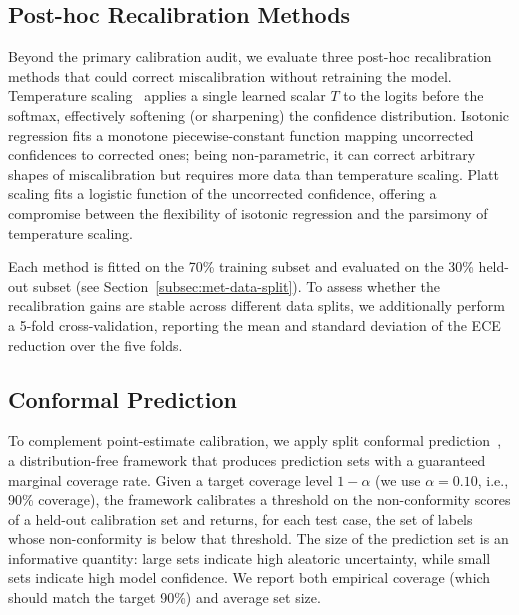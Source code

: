 \subsection{Post-hoc Recalibration Methods}
\label{subsec:met-recalibration}

Beyond the primary calibration audit, we evaluate three post-hoc 
recalibration methods that could correct miscalibration without retraining 
the model. Temperature scaling~\cite{guo2017calibration} applies a single 
learned scalar $T$ to the logits before the softmax, effectively 
softening (or sharpening) the confidence distribution. Isotonic 
regression fits a monotone piecewise-constant function mapping 
uncorrected confidences to corrected ones; being non-parametric, it can 
correct arbitrary shapes of miscalibration but requires more data than 
temperature scaling. Platt scaling fits a logistic function of the 
uncorrected confidence, offering a compromise between the flexibility of 
isotonic regression and the parsimony of temperature scaling.

Each method is fitted on the 70\% training subset and evaluated on the 
30\% held-out subset (see Section~\ref{subsec:met-data-split}). To assess 
whether the recalibration gains are stable across different data splits, 
we additionally perform a 5-fold cross-validation, reporting the mean 
and standard deviation of the ECE reduction over the five folds.

\subsection{Conformal Prediction}
\label{subsec:met-conformal}

To complement point-estimate calibration, we apply split conformal 
prediction~\cite{vovk2005}, a distribution-free framework that produces 
prediction sets with a guaranteed marginal coverage rate. Given a 
target coverage level $1 - \alpha$ (we use $\alpha = 0.10$, i.e., 90\% 
coverage), the framework calibrates a threshold on the non-conformity 
scores of a held-out calibration set and returns, for each test case, 
the set of labels whose non-conformity is below that threshold. The 
size of the prediction set is an informative quantity: large sets 
indicate high aleatoric uncertainty, while small sets indicate high 
model confidence. We report both empirical coverage (which should match 
the target 90\%) and average set size.

